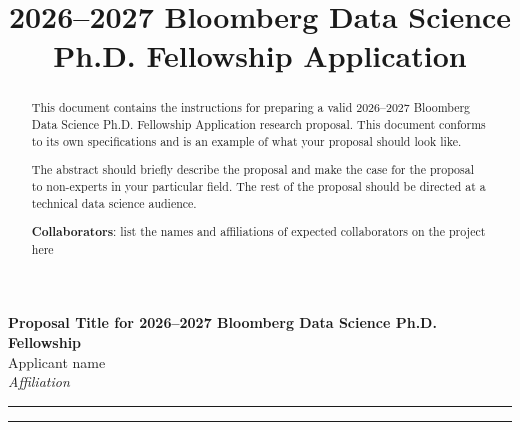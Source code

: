 \documentclass[10pt]{article}
\author{}
\title{2026--2027 Bloomberg Data Science Ph.D. Fellowship Application}
\begin{document}
	
	\begin{center}
		{\Large \textbf{Proposal Title for 2026--2027 Bloomberg Data Science Ph.D. Fellowship}}\\
		\vspace{1em}
		{\large Applicant name}\\
		\vspace{1em}
		\textit{Affiliation}
	\end{center}
	

	\begin{center}
		\rule{150mm}{0.2mm}
	\end{center}		

	\begin{abstract}
	
	This document contains the instructions for preparing a valid 2026--2027 Bloomberg Data Science Ph.D. Fellowship Application research proposal. This document conforms to its own specifications and is an example of what your proposal should look like.
	
	The abstract should briefly describe the proposal and make the case for the proposal to non-experts in your particular field. The rest of the proposal should be directed at a technical data science audience.
	
	\textbf{Collaborators}: list the names and affiliations of expected collaborators on the project here
	\end{abstract}

	\begin{center}
		\rule{150mm}{0.2mm}
	\end{center}		

	\vspace{5mm}
	
\end{document}
